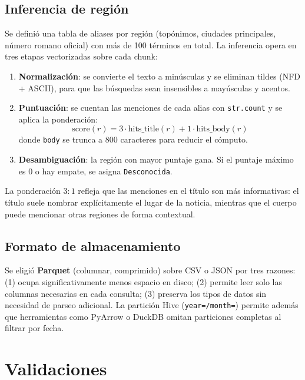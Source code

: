 \documentclass[11pt, letterpaper]{article}
\begin{document}
\subsection{Inferencia de región}
\label{sec:region}

Se definió una tabla de aliases por región (topónimos, ciudades principales,
número romano oficial) con más de 100 términos en total. La inferencia opera
en tres etapas vectorizadas sobre cada chunk:

\begin{enumerate}[noitemsep]
  \item \textbf{Normalización}: se convierte el texto a minúsculas y se
    eliminan tildes (NFD + ASCII), para que las búsquedas sean
    insensibles a mayúsculas y acentos.
  \item \textbf{Puntuación}: se cuentan las menciones de cada alias con
    \texttt{str.count} y se aplica la ponderación:
    \[
      \text{score}(r) = 3 \cdot \text{hits\_title}(r)
                      + 1 \cdot \text{hits\_body}(r)
    \]
    donde \texttt{body} se trunca a 800 caracteres para reducir el cómputo.
  \item \textbf{Desambiguación}: la región con mayor puntaje gana.
    Si el puntaje máximo es 0 o hay empate, se asigna \texttt{Desconocida}.
\end{enumerate}

La ponderación $3\!:\!1$ refleja que las menciones en el título son más
informativas: el título suele nombrar explícitamente el lugar de la noticia,
mientras que el cuerpo puede mencionar otras regiones de forma contextual.

\subsection{Formato de almacenamiento}

Se eligió \textbf{Parquet} (columnar, comprimido) sobre CSV o JSON por tres
razones: (1) ocupa significativamente menos espacio en disco; (2) permite
leer solo las columnas necesarias en cada consulta; (3) preserva los tipos
de datos sin necesidad de parseo adicional. La partición Hive
(\texttt{year=/month=}) permite además que herramientas como PyArrow o
DuckDB omitan particiones completas al filtrar por fecha.

\section{Validaciones}
\label{sec:validaciones}
\end{document}
